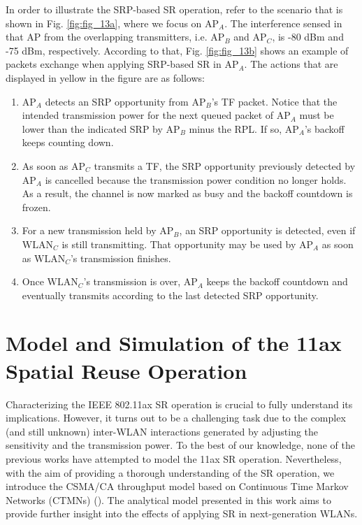 \documentclass[preprint,12pt]{elsarticle}
\begin{document}
	In order to illustrate the SRP-based SR operation, refer to the scenario that is shown in Fig. \ref{fig:fig_13a}, where we focus on $\text{AP}_A$. The interference sensed in that AP from the overlapping transmitters, i.e. $\text{AP}_B$ and $\text{AP}_C$, is -80 dBm and -75 dBm, respectively. According to that, Fig. \ref{fig:fig_13b} shows an example of packets exchange when applying SRP-based SR in $\text{AP}_A$. The actions that are displayed in yellow in the figure are as follows:
	\begin{enumerate}
		\item $\text{AP}_A$ detects an SRP opportunity from $\text{AP}_B$'s TF packet. Notice that the intended transmission power for the next queued packet of $\text{AP}_A$ must be lower than the indicated SRP by $\text{AP}_B$ minus the RPL. If so, $\text{AP}_A$'s backoff keeps counting down.
		\item As soon as $\text{AP}_C$ transmits a TF, the SRP opportunity previously detected by $\text{AP}_A$ is cancelled because the transmission power condition no longer holds. As a result, the channel is now marked as busy and the backoff countdown is frozen.
		\item For a new transmission held by $\text{AP}_B$, an SRP opportunity is detected, even if $\text{WLAN}_C$ is still transmitting. That opportunity may be used by $\text{AP}_A$ as soon as $\text{WLAN}_C$'s transmission finishes.
		\item Once $\text{WLAN}_C$'s transmission is over, $\text{AP}_A$ keeps the backoff countdown and eventually transmits according to the last detected SRP opportunity.
	\end{enumerate}
	
	
	\section{Model and Simulation of the 11ax Spatial Reuse Operation}
	\label{section:analytical_model}
	
	Characterizing the IEEE 802.11ax SR operation is crucial to fully understand its implications. However, it turns out to be a challenging task due to the complex (and still unknown) inter-WLAN interactions generated by adjusting the sensitivity and the transmission power. To the best of our knowledge, none of the previous works have attempted to model the 11ax SR operation. Nevertheless, with the aim of providing a thorough understanding of the SR operation, we introduce the CSMA/CA throughput model based on Continuous Time Markov Networks (CTMNs) (\citealp{bellalta2014throughput, bellalta2017throughput}). The analytical model presented in this work aims to provide further insight into the effects of applying SR in next-generation WLANs.
	
\end{document}
